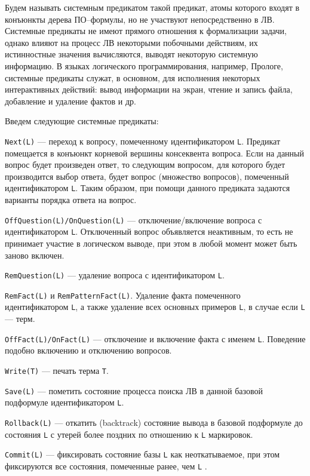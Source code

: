 Будем называть системным предикатом такой предикат, атомы которого входят в конъюнкты дерева ПО--формулы, но не участвуют непосредственно в ЛВ. Системные предикаты не имеют прямого отношения к формализации задачи, однако влияют на процесс ЛВ некоторыми побочными действиям, их истинностные значения вычисляются, выводят некоторую системную информацию. В языках логического программирования, например, Прологе, системные предикаты служат, в основном, для исполнения некоторых интерактивных действий: вывод информации на экран, чтение и запись файла, добавление и удаление фактов и др.

Введем следующие системные предикаты:
\begin{description}

\item{\texttt{Next(L)}} --- переход к вопросу, помеченному идентификатором \texttt{L}. Предикат помещается в конъюнкт корневой вершины консеквента вопроса.  Если на данный вопрос будет произведен ответ, то следующим вопросом, для которого будет производится выбор ответа, будет вопрос (множество вопросов), помеченный идентификатором \texttt{L}. Таким образом, при помощи данного предиката задаются варианты порядка ответа на вопрос.

\item{\texttt{OffQuestion(L)/OnQuestion(L)}} --- отключение/включение вопроса с идентификатором \texttt{L}. Отключенный вопрос объявляется неактивным, то есть не принимает участие в логическом выводе, при этом в любой момент может быть заново включен.

\item{\texttt{RemQuestion(L)}} --- удаление вопроса с идентификатором \texttt{L}.

\item{\texttt{RemFact(L)} и \texttt{RemPatternFact(L)}}. Удаление факта помеченного идентификатором \texttt{L}, а также удаление всех основных примеров \texttt{L}, в случае если \texttt{L} --– терм.

\item{\texttt{OffFact(L)/OnFact(L)}} --- отключение и включение факта с именем \texttt{L}. Поведение подобно включению и отключению вопросов.

\item{\texttt{Write(T)}} --- печать терма \texttt{T}.

\item{\texttt{Save(L)}} --- пометить состояние процесса поиска ЛВ в данной базовой подформуле идентификатором \texttt{L}.

\item{\texttt{Rollback(L)}} --- откатить (backtrack) состояние вывода в базовой подформуле до состояния \texttt{L} с утерей более поздних по отношению к \texttt{L} маркировок.

\item{\texttt{Commit(L)}} --- фиксировать состояние базы \texttt{L} как неоткатываемое, при этом фиксируются все состояния, помеченные ранее, чем \texttt{L} .
\end{description}
